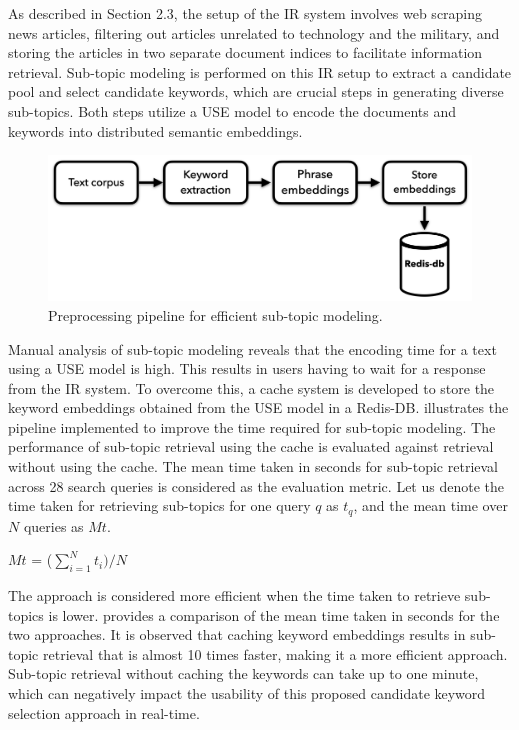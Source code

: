 As described in Section 2.3, the setup of the \ac{IR} system involves web scraping news articles, filtering out articles unrelated to technology and the military, and storing the articles in two separate document indices to facilitate information retrieval. Sub-topic modeling is performed on this \ac{IR} setup to extract a candidate pool and select candidate keywords, which are crucial steps in generating diverse sub-topics. Both steps utilize a \ac{USE} model to encode the documents and keywords into distributed semantic embeddings.


\begin{figure}[h]
	\centering
	\includegraphics[width=.9\textwidth]{images/thesis_images/redisdb.png}
	\caption[Pjpeline for efficient sub-topics.]{Preprocessing pipeline for efficient sub-topic modeling. \label{fig:redis_db}}
\end{figure}

Manual analysis of sub-topic modeling reveals that the encoding time for a text using a \ac{USE} model is high. This results in users having to wait for a response from the \ac{IR} system. To overcome this, a cache system is developed to store the keyword embeddings obtained from the \ac{USE} model in a Redis-DB.  illustrates the pipeline implemented to improve the time required for sub-topic modeling. The performance of sub-topic retrieval using the cache is evaluated against retrieval without using the cache. The mean time taken in seconds for sub-topic retrieval across 28 search queries is considered as the evaluation metric. Let us denote the time taken for retrieving sub-topics for one query $q$ as $t_q$, and the mean time over $N$ queries as $Mt$.


\centerline{$Mt$ = ($\sum\limits_{i=1}^N t_i) /N$}

The approach is considered more efficient when the time taken to retrieve sub-topics is lower.  provides a comparison of the mean time taken in seconds for the two approaches. It is observed that caching keyword embeddings results in sub-topic retrieval that is almost 10 times faster, making it a more efficient approach. Sub-topic retrieval without caching the keywords can take up to one minute, which can negatively impact the usability of this proposed candidate keyword selection approach in real-time.


